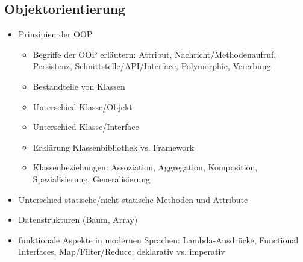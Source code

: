 \subsection{Objektorientierung}
\label{sec:Objektorientierung}

\begin{itemize}
	\item Prinzipien der OOP
	\begin{itemize}
		\item Begriffe der OOP erläutern: Attribut, Nachricht/Methodenaufruf, Persistenz, Schnittstelle/API/Interface, Polymorphie, Vererbung
		\item Bestandteile von Klassen
		\item Unterschied Klasse/Objekt
		\item Unterschied Klasse/Interface
		\item Erklärung Klassenbibliothek vs. Framework
		\item Klassenbeziehungen: Assoziation, Aggregation, Komposition, Spezialisierung, Generalisierung
	\end{itemize}
	\item Unterschied statische/nicht-statische Methoden und Attribute
	\item Datenstrukturen (Baum, Array)
	\item funktionale Aspekte in modernen Sprachen: Lambda-Ausdrücke, Functional Interfaces, Map/Filter/Reduce, deklarativ vs. imperativ
\end{itemize}